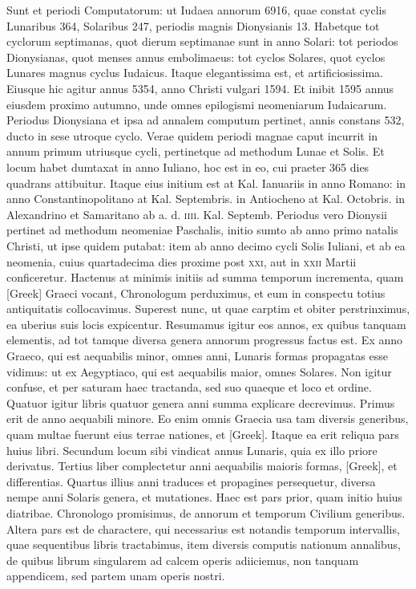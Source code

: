 Sunt et periodi Computatorum: ut Iudaea
annorum 6916, quae constat cyclis Lunaribus 364, Solaribus 247, periodis
magnis Dionysianis 13.
Habetque tot cyclorum septimanas,
quot dierum septimanae sunt in anno Solari: tot periodos Dionysianas,
quot menses annus embolimaeus: tot cyclos Solares, quot cyclos
Lunares magnus cyclus Iudaicus.
Itaque elegantissima est, et artificiosissima.
Eiusque hic agitur annus 5354, anno Christi vulgari 1594.
Et inibit 1595 annus eiusdem proximo autumno, unde omnes epilogismi
neomeniarum Iudaicarum.
Periodus Dionysiana et ipsa ad
annalem computum pertinet, annis constans 532, ducto in sese utroque
cyclo.
Verae quidem periodi magnae caput incurrit in annum
primum utriusque cycli, pertinetque ad methodum Lunae et Solis.
Et
locum habet dumtaxat in anno Iuliano, hoc est in eo, cui praeter 365
dies quadrans attibuitur.
Itaque eius initium est at Kal. Ianuariis in
anno Romano: in anno Constantinopolitano at Kal. Septembris. in
Antiocheno at Kal. Octobris. in Alexandrino et Samaritano ab a. d.
\textsc{iiii}. Kal. Septemb.
Periodus vero Dionysii pertinet ad methodum
neomeniae Paschalis, initio sumto ab anno primo natalis Christi, ut
ipse quidem putabat: item ab anno decimo cycli Solis Iuliani, et ab
ea neomenia, cuius quartadecima dies proxime post
 \textsc{xxi}, aut in \textsc{xxii}
Martii conficeretur.
Hactenus at minimis initiis ad summa temporum
incrementa, quam \textgreek{[Greek]} Graeci vocant, Chronologum
perduximus, et eum in conspectu totius antiquitatis collocavimus.
Superest nunc, ut quae carptim et obiter perstrinximus, ea uberius
suis locis expicentur.
Resumamus igitur eos annos, ex quibus tanquam
elementis, ad tot tamque diversa genera annorum progressus
factus est.
Ex anno Graeco, qui est aequabilis minor, omnes anni, Lunaris
formas propagatas esse vidimus: ut ex Aegyptiaco, qui est aequabilis
maior, omnes Solares.
Non igitur confuse, et per saturam haec
tractanda, sed suo quaeque et loco et ordine.
Quatuor igitur libris
quatuor genera anni summa explicare decrevimus.
Primus erit de
anno aequabili minore.
Eo enim omnis Graecia usa tam diversis generibus,
quam multae fuerunt eius terrae nationes, et \textgreek{[Greek]}.
Itaque
ea erit reliqua pars huius libri.
Secundum locum sibi vindicat annus
Lunaris, quia ex illo priore derivatus.
Tertius liber complectetur anni
aequabilis maioris formas, \textgreek{[Greek]}, et differentias.
Quartus illius anni
traduces et propagines persequetur, diversa nempe anni Solaris genera,
et mutationes.
Haec est pars prior, quam initio huius diatribae.
Chronologo promisimus, de annorum et temporum Civilium generibus.
Altera pars est de charactere, qui necessarius est notandis temporum
intervallis, quae sequentibus libris tractabimus, item diversis
computis nationum annalibus, de quibus librum singularem ad calcem
operis adiiciemus, non tanquam appendicem, sed partem unam
operis nostri.

